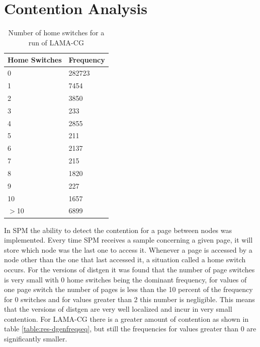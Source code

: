 \section{Contention Analysis}\label{section:rescont}

\begin{table}
	\centering
		\begin{tabularx}{.5\textwidth}{|l|X|}
		\hline
			Home Switches & Frequency   \\
			\hline
			0 & 282723
   \\
			\hline
			1 & 7454
   \\
			\hline
			2 & 3850 \\
			\hline
			3 & 233  \\
			\hline
			4 & 2855  \\
			\hline
			5 & 211  \\
			\hline
			6 & 2137  \\
			\hline
			7 & 215  \\
			\hline
			8 & 1820  \\
			\hline
			9 & 227  \\
			\hline
			10 & 1657 \\
			\hline
			$>$10 & 6899 \\
			\hline
		\end{tabularx}
		\caption{Number of home switches for a run of LAMA-CG}
		\label{table:res-dgencontent}
\end{table}

In SPM the ability to detect the contention for a page between nodes was implemented. Every time SPM receives a sample concerning a given page, it will store which node was the last one to access it. Whenever a page is accessed by a node other than the one that last accessed it, a situation called a home switch occurs. For the versions of distgen it was found that the number of page switches is very small with 0 home switches being the dominant frequency, for values of one page switch the number of pages is less than the 10 percent of the frequency for 0 switches and for values greater than 2 this number is negligible. This means that the versions of distgen are very well localized and incur in very small contention. For LAMA-CG there is a greater amount of contention as shown in table \ref{table:res-dgenfreqseq}, but still the frequencies for values greater than 0 are significantly smaller.

